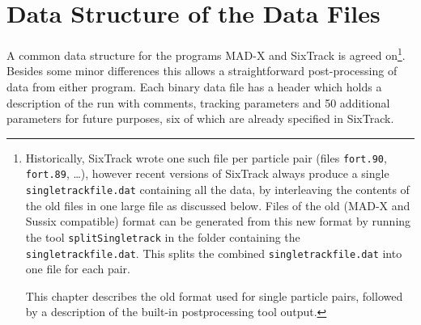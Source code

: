 \chapter{Data Structure of the Data Files} \label{Header}

A common data structure for the programs MAD-X and SixTrack is agreed on\footnote{
Historically, SixTrack wrote one such file per particle pair (files \texttt{fort.90}, \texttt{fort.89}, \ldots), however recent versions of SixTrack always produce a single \texttt{singletrackfile.dat} containing all the data, by interleaving the contents of the old files in one large file as discussed below.
Files of the old (MAD-X and Sussix compatible) format can be generated from this new format by running the tool \texttt{splitSingletrack} in the folder containing the \texttt{singletrackfile.dat}.
This splits the combined \texttt{singletrackfile.dat} into one file for each pair.

This chapter describes the old format used for single particle pairs, followed by a description of the built-in postprocessing tool output.}.
Besides some minor differences this allows a straightforward post-processing of data from either program.
Each binary data file has a header which holds a description of the run with comments, tracking parameters and 50 additional parameters for future purposes, six of which are already specified in SixTrack.

